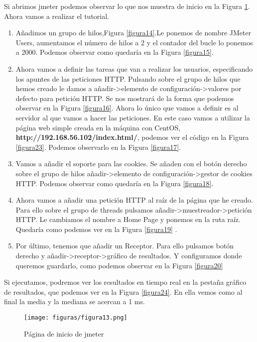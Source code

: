 Si abrimos jmeter podemos observar lo que nos muestra de inicio en la Figura \ref{figura13}. Ahora vamos a realizar el tutorial.\\

\begin{enumerate}
	\item Añadimos un grupo de hilos,Figura \ref{figura14}.Le ponemos de nombre JMeter Users, aumentamos el número de hilos a 2 y el contador del bucle lo ponemos a 2000. Podemos observar como quedaría en la Figura \ref{figura15}.
	\item Ahora vamos a definir las tareas que van a realizar los usuarios, especificando los apuntes de las peticiones HTTP. Pulsando sobre el grupo de hilos que hemos creado le damos a añadir->elemento de configuración->valores por defecto para petición HTTP.  Se nos mostrará de la forma que podemos observar en la Figura \ref{figura16}. Ahora lo único que vamos a definir es al servidor al que vamos a hacer las peticiones. En este caso vamos a utilizar la página web simple creada en la máquina con CentOS, \textbf{http://192.168.56.102/index.html/}, podemos ver el código en la Figura \ref{figura23}. Podemos observarlo en la Figura \ref{figura17}. 
	\item Vamos a añadir el soporte para las cookies. Se añaden con el botón derecho sobre el grupo de hilos añadir->elemento de configuración->gestor de cookies HTTP. Podemos observar como quedaría en la Figura \ref{figura18}.
	\item Ahora vamos a añadir una petición HTTP al raíz de la página que he creado. Para ello sobre el grupo de threads pulsamos  añadir->muestreador->petición HTTP. Le cambiamos el nombre a Home Page y ponemos en la ruta raíz. Quedaría como podemos ver en la Figura \ref{figura19} . 
	\item Por último, tenemos que añadir un Receptor. Para ello pulsamos botón derecho y añadir->receptor->gráfico de resultados. Y configuramos donde queremos guardarlo, como podemos observar en la Figura \ref{figura20}
\end{enumerate}

Si ejecutamos, podremos ver los resultados en tiempo real en la pestaña  gráfico de resultados, que podemos ver en la Figura \ref{figura24}. En ella vemos como al final la media y la mediana se acercan a 1 ms.
\begin{figure}[H] %
	\centering
	\texttt{[image: figuras/figura13.png]}  %
	
	
	\caption{Página de inicio de jmeter}
	\label{figura13}
\end{figure}

